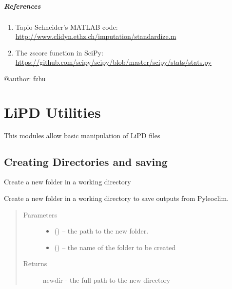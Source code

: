 \documentclass[letterpaper,10pt,english]{sphinxmanual}
\begin{document}
\begin{fulllineitems}
\paragraph{References}
\begin{enumerate}
\item {} 
Tapio Schneider's MATLAB code: \url{http://www.clidyn.ethz.ch/imputation/standardize.m}

\item {} 
The zscore function in SciPy: \url{https://github.com/scipy/scipy/blob/master/scipy/stats/stats.py}

\end{enumerate}

@author: fzhu

\end{fulllineitems}



\chapter{LiPD Utilities}
\label{\detokenize{LipdUtils::doc}}\label{\detokenize{LipdUtils:lipd-utilities}}
This modules allow basic manipulation of LiPD files


\section{Creating Directories and saving}
\label{\detokenize{LipdUtils:creating-directories-and-saving}}

\begin{fulllineitems}
\label{\detokenize{LipdUtils:pyleoclim.LipdUtils.createDir}}
Create a new folder in a working directory

Create a new folder in a working directory to save outputs from Pyleoclim.
\begin{quote}\begin{description}
\item[{Parameters}] \leavevmode\begin{itemize}
\item {} 
 () -- the path to the new folder.

\item {} 
 () -- the name of the folder to be created

\end{itemize}

\item[{Returns}] \leavevmode
newdir - the full path to the new directory

\end{description}\end{quote}

\end{fulllineitems}
\end{document}
